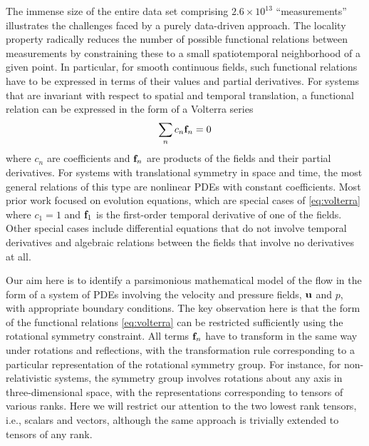 \documentclass[
 reprint,
 amsmath,amssymb,
 aps,
]{revtex4-2}
\begin{document}
The immense size of the entire data set comprising $2.6\times 10^{13}$ ``measurements'' illustrates the challenges faced by a purely data-driven approach. The locality property radically reduces the number of possible functional relations between measurements by constraining these to a small spatiotemporal neighborhood of a given point. In particular, for smooth continuous fields, such functional relations have to be expressed in terms of their values and partial derivatives. For systems that are invariant with respect to spatial and temporal translation,
a functional relation can be expressed in the form of a Volterra series
\begin{equation}\label{eq:volterra}
\sum_n c_n {\bf f}_n = 0
\end{equation}
where $c_n$ are coefficients and ${\bf f}_n$ are products of the fields and their partial derivatives. For systems with translational symmetry in space and time, the most general relations of this type are nonlinear PDEs with constant coefficients. Most prior work focused on evolution equations, which are special cases of \eqref{eq:volterra} where $c_1=1$ and ${\bf f}_1$ is the first-order temporal derivative of one of the fields. Other special cases include differential equations that do not involve temporal derivatives and algebraic relations between the fields that involve no derivatives at all.

Our aim here is to identify a parsimonious mathematical model of the flow in the form of a system of PDEs involving the velocity and pressure fields, ${\bf u}$ and $p$, with appropriate boundary conditions. The key observation here is that the form of the functional relations \eqref{eq:volterra} can be restricted sufficiently using the rotational symmetry constraint. All terms ${\bf f}_n$ have to transform in the same way under rotations and reflections, with the transformation rule corresponding to a particular representation of the rotational symmetry group. For instance, for non-relativistic systems, the symmetry group involves rotations about any axis in three-dimensional space, with the representations corresponding to tensors of various ranks. Here we will restrict our attention to the two lowest rank tensors, i.e., scalars and vectors, although the same approach is trivially extended to tensors of any rank.
\end{document}
